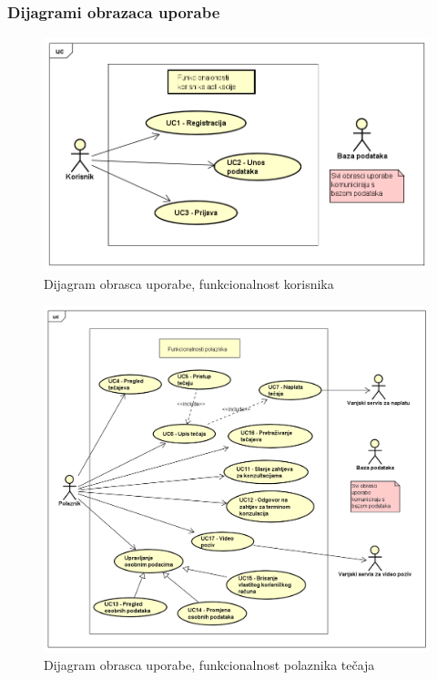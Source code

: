 				\subsubsection{Dijagrami obrazaca uporabe}
					
					\begin{figure}[h]
						\includegraphics[scale=0.68]{dijagrami/UML_kor.PNG}
						\centering
						\caption{Dijagram obrasca uporabe, funkcionalnost korisnika}
						\label{fig:UML_kor}
					\end{figure}
				\eject
					
					\begin{figure}[h]
						\includegraphics[scale=0.55]{dijagrami/UML_pol.PNG}
						\centering
						\caption{Dijagram obrasca uporabe, funkcionalnost polaznika tečaja}
						\label{fig:UML_pol}
					\end{figure}
				\eject
				
